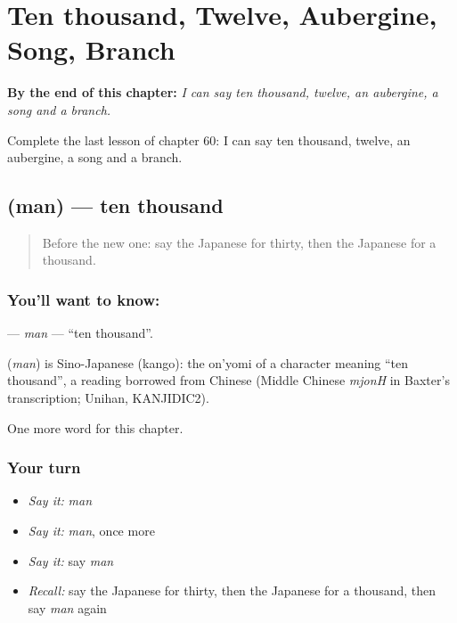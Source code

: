 
\chapter{Ten thousand, Twelve, Aubergine, Song, Branch}
\label{ch:ja-ten-thousand-twelve-aubergine-song-branch}

\begin{chapteropening}
\textbf{By the end of this chapter:} \emph{I can say ten thousand, twelve, an aubergine, a song and a branch.}

Complete the last lesson of chapter 60: I can say ten thousand, twelve, an aubergine, a song and a branch.
\end{chapteropening}

\section[\texorpdfstring{\ja{まん} (man)}{まん (man)}]{ (man) — ten thousand}

\label{lesson:JA-C60-man}



\begin{quote}
Before the new one: say the Japanese for thirty, then the Japanese for a thousand.
\end{quote}

\subsection*{You'll want to know: }
\textbf{} — \emph{man} — \textquotedblleft{}ten thousand\textquotedblright{}.

\begin{cousinweb}
\textbf{} (\emph{man}) is Sino-Japanese (kango): the on'yomi of a character meaning \textquotedblleft{}ten thousand\textquotedblright{}, a reading borrowed from Chinese (Middle Chinese \emph{mjonH} in Baxter's transcription; Unihan, KANJIDIC2).
\end{cousinweb}

\begin{grammarlens}[title={What you've built}]
One more word for this chapter.
\end{grammarlens}

\subsection*{Your turn}
\begin{itemize}
\raggedright
  \item \emph{Say it:} \emph{man}
  \item \emph{Say it:} \emph{man}, once more
  \item \emph{Say it:} say \emph{man}
  \item \emph{Recall:} say the Japanese for thirty, then the Japanese for a thousand, then say \emph{man} again
\end{itemize}

